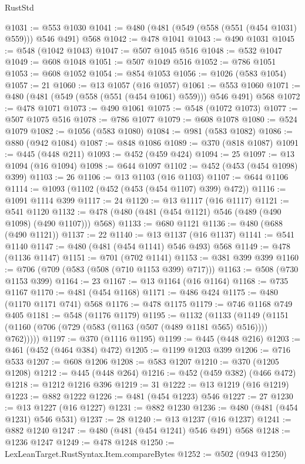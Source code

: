 \begin{lexlean}{RustStd}
\begin{coremodule}
@1031 := @553 @1030
@1041 := @480 (@481 (@549 (@558 (@551 (@454 @1031) @559))) @546 @491) @568
@1042 := @478 @1041
@1043 := @490 @1031
@1045 := @548 (@1042 @1043)
@1047 := @507 @1045 @516
@1048 := @532 @1047
@1049 := @608 @1048
@1051 := @507 @1049 @516
@1052 := @786 @1051
@1053 := @608 @1052
@1054 := @854 @1053
@1056 := @1026 (@583 @1054)
@1057 := 21
@1060 := @13 @1057 (@16 @1057)
@1061 := @553 @1060
@1071 := @480 (@481 (@549 (@558 (@551 (@454 @1061) @559))) @546 @491) @568
@1072 := @478 @1071
@1073 := @490 @1061
@1075 := @548 (@1072 @1073)
@1077 := @507 @1075 @516
@1078 := @786 @1077
@1079 := @608 @1078
@1080 := @524 @1079
@1082 := @1056 (@583 @1080)
@1084 := @981 (@583 @1082)
@1086 := @880 (@942 @1084)
@1087 := @848 @1086
@1089 := @370 (@818 @1087)
@1091 := @445 (@448 @211)
@1093 := @452 (@459 @424)
@1094 := 25
@1097 := @13 @1094 (@16 @1094)
@1098 := @644 @1097
@1102 := @452 (@453 (@454 @1098) @399)
@1103 := 26
@1106 := @13 @1103 (@16 @1103)
@1107 := @644 @1106
@1114 := @1093 (@1102 (@452 (@453 (@454 @1107) @399) @472))
@1116 := @1091 @1114 @399
@1117 := 24
@1120 := @13 @1117 (@16 @1117)
@1121 := @541 @1120
@1132 := @478 (@480 (@481 (@454 @1121) @546 (@489 (@490 @1098) (@490 @1107))) @568)
@1133 := @680 @1121
@1136 := @480 (@688 (@490 @1121))
@1137 := 22
@1140 := @13 @1137 (@16 @1137)
@1141 := @541 @1140
@1147 := @480 (@481 (@454 @1141) @546 @493) @568
@1149 := @478 (@1136 @1147)
@1151 := @701 (@702 @1141)
@1153 := @381 @399 @399
@1160 := @706 (@709 (@583 (@508 (@710 @1153 @399) @717)))
@1163 := @508 (@730 @1153 @399)
@1164 := 23
@1167 := @13 @1164 (@16 @1164)
@1168 := @735 @1167
@1170 := @481 (@454 @1168)
@1171 := @486 @424
@1175 := @480 (@1170 @1171 @741) @568
@1176 := @478 @1175
@1179 := @746 @1168 @749 @405
@1181 := @548 (@1176 @1179)
@1195 := @1132
    (@1133 (@1149 (@1151 (@1160 (@706 (@729 (@583 (@1163 (@507 (@489 @1181 @565) @516)))) @762)))))
@1197 := @370 (@1116 @1195)
@1199 := @445 (@448 @216)
@1203 := @461 (@452 (@464 @384) @472)
@1205 := @1199 @1203 @399
@1206 := @716 @533
@1207 := @608 @1206
@1208 := @583 @1207
@1210 := @370 (@1205 @1208)
@1212 := @445 (@448 @264)
@1216 := @452 (@459 @382) (@466 @472)
@1218 := @1212 @1216 @396
@1219 := 31
@1222 := @13 @1219 (@16 @1219)
@1223 := @882 @1222
@1226 := @481 (@454 @1223) @546
@1227 := 27
@1230 := @13 @1227 (@16 @1227)
@1231 := @882 @1230
@1236 := @480 (@481 (@454 @1231) @546 @531)
@1237 := 28
@1240 := @13 @1237 (@16 @1237)
@1241 := @882 @1240
@1247 := @480 (@481 (@454 @1241) @546 @491) @568
@1248 := @1236 @1247
@1249 := @478 @1248
@1250 := LexLeanTarget.RustSyntax.Item.compareBytes
@1252 := @502 (@943 @1250)

\end{coremodule}
\end{lexlean}
